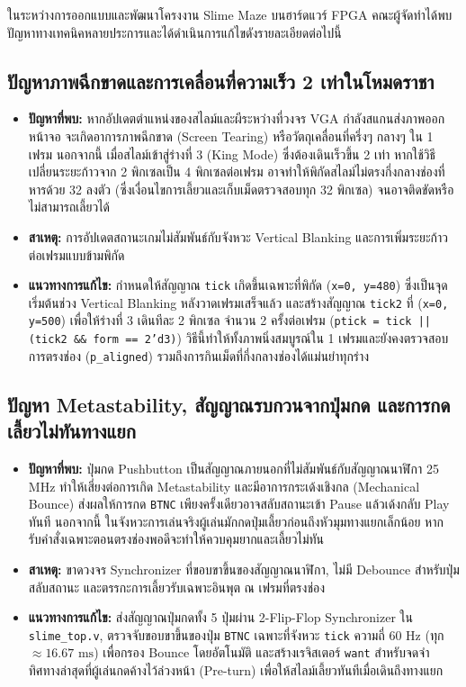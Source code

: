 \documentclass[12pt,a4paper]{article}
\begin{document}
ในระหว่างการออกแบบและพัฒนาโครงงาน Slime Maze บนฮาร์ดแวร์ FPGA คณะผู้จัดทำได้พบปัญหาทางเทคนิคหลายประการและได้ดำเนินการแก้ไขดังรายละเอียดต่อไปนี้

\subsection{ปัญหาภาพฉีกขาดและการเคลื่อนที่ความเร็ว 2 เท่าในโหมดราชา}
\begin{itemize}[leftmargin=1.5cm]
    \item \textbf{ปัญหาที่พบ:} หากอัปเดตตำแหน่งของสไลม์และผีระหว่างที่วงจร VGA กำลังสแกนส่งภาพออกหน้าจอ จะเกิดอาการภาพฉีกขาด (Screen Tearing) หรือวัตถุเคลื่อนที่ครึ่งๆ กลางๆ ใน 1 เฟรม นอกจากนี้ เมื่อสไลม์เข้าสู่ร่างที่ 3 (King Mode) ซึ่งต้องเดินเร็วขึ้น 2 เท่า หากใช้วิธีเปลี่ยนระยะก้าวจาก 2 พิกเซลเป็น 4 พิกเซลต่อเฟรม อาจทำให้พิกัดสไลม์ไม่ตรงกึ่งกลางช่องที่หารด้วย 32 ลงตัว (ซึ่งเงื่อนไขการเลี้ยวและเก็บเม็ดตรวจสอบทุก 32 พิกเซล) จนอาจติดขัดหรือไม่สามารถเลี้ยวได้
    \item \textbf{สาเหตุ:} การอัปเดตสถานะเกมไม่สัมพันธ์กับจังหวะ Vertical Blanking และการเพิ่มระยะก้าวต่อเฟรมแบบข้ามพิกัด
    \item \textbf{แนวทางการแก้ไข:} กำหนดให้สัญญาณ \texttt{tick} เกิดขึ้นเฉพาะที่พิกัด (\texttt{x=0, y=480}) ซึ่งเป็นจุดเริ่มต้นช่วง Vertical Blanking หลังวาดเฟรมเสร็จแล้ว และสร้างสัญญาณ \texttt{tick2} ที่ (\texttt{x=0, y=500}) เพื่อให้ร่างที่ 3 เดินทีละ 2 พิกเซล จำนวน 2 ครั้งต่อเฟรม (\texttt{ptick = tick || (tick2 \&\& form == 2'd3)}) วิธีนี้ทำให้ทั้งภาพนิ่งสมบูรณ์ใน 1 เฟรมและยังคงตรวจสอบการตรงช่อง (\texttt{p\_aligned}) รวมถึงการกินเม็ดที่กึ่งกลางช่องได้แม่นยำทุกร่าง
\end{itemize}

\subsection{ปัญหา Metastability, สัญญาณรบกวนจากปุ่มกด และการกดเลี้ยวไม่ทันทางแยก}
\begin{itemize}[leftmargin=1.5cm]
    \item \textbf{ปัญหาที่พบ:} ปุ่มกด Pushbutton เป็นสัญญาณภายนอกที่ไม่สัมพันธ์กับสัญญาณนาฬิกา 25 MHz ทำให้เสี่ยงต่อการเกิด Metastability และมีอาการกระเด้งเชิงกล (Mechanical Bounce) ส่งผลให้การกด \texttt{BTNC} เพียงครั้งเดียวอาจสลับสถานะเข้า Pause แล้วเด้งกลับ Play ทันที นอกจากนี้ ในจังหวะการเล่นจริงผู้เล่นมักกดปุ่มเลี้ยวก่อนถึงหัวมุมทางแยกเล็กน้อย หากรับคำสั่งเฉพาะตอนตรงช่องพอดีจะทำให้ควบคุมยากและเลี้ยวไม่ทัน
    \item \textbf{สาเหตุ:} ขาดวงจร Synchronizer ที่ขอบขาขึ้นของสัญญาณนาฬิกา, ไม่มี Debounce สำหรับปุ่มสลับสถานะ และตรรกะการเลี้ยวรับเฉพาะอินพุต ณ เฟรมที่ตรงช่อง
    \item \textbf{แนวทางการแก้ไข:} ส่งสัญญาณปุ่มกดทั้ง 5 ปุ่มผ่าน 2-Flip-Flop Synchronizer ใน \texttt{slime\_top.v}, ตรวจจับขอบขาขึ้นของปุ่ม \texttt{BTNC} เฉพาะที่จังหวะ \texttt{tick} ความถี่ 60 Hz (ทุก $\approx 16.67\text{ ms}$) เพื่อกรอง Bounce โดยอัตโนมัติ และสร้างเรจิสเตอร์ \texttt{want} สำหรับจดจำทิศทางล่าสุดที่ผู้เล่นกดค้างไว้ล่วงหน้า (Pre-turn) เพื่อให้สไลม์เลี้ยวทันทีเมื่อเดินถึงทางแยก
\end{itemize}
\end{document}
